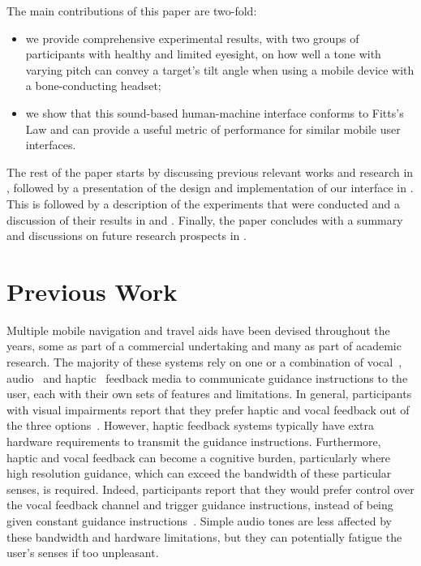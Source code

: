 \documentclass[acmsmall]{acmart}
\begin{document}
The main contributions of this paper are two-fold: 
\begin{itemize}
  \item we provide comprehensive experimental results, with two groups of participants with healthy and limited eyesight, on how well a tone with varying pitch can convey a target's tilt angle when using a mobile device with a bone-conducting headset; 
  \item we show that this sound-based human-machine interface conforms to Fitts's Law and can provide a useful metric of performance for similar mobile user interfaces.
\end{itemize}

The rest of the paper starts by discussing previous relevant works and research in , followed by a presentation of the design and implementation of our interface in .
This is followed by a description of the experiments that were conducted and a discussion of their results in  and .
Finally, the paper concludes with a summary and discussions on future research prospects in .

\section{Previous Work}\label{sec:prev-work}

Multiple mobile navigation and travel aids have been devised throughout the years, some as part of a commercial undertaking and many as part of academic research.
The majority of these systems rely on one or a combination of vocal~\citep{mocanu2016when,chessa2016integrated,kanwal2015navigation}, audio~\citep{schwarze2015intuitive,rodriguez2012obstacle,katz2010navig} and haptic~\citep{rivera-rubio2015assistive,lee2015rgb,xiao2015assistive} feedback media to communicate guidance instructions to the user, each with their own sets of features and limitations.
In general, participants with visual impairments report that they prefer haptic and vocal feedback out of the three options~\citep{arditi2013user}.
However, haptic feedback systems typically have extra hardware requirements to transmit the guidance instructions.
Furthermore, haptic and vocal feedback can become a cognitive burden, particularly where high resolution guidance, which can exceed the bandwidth of these particular senses, is required.
Indeed, participants report that they would prefer control over the vocal feedback channel and trigger guidance instructions, instead of being given constant guidance instructions~\citep{arditi2013user}.
Simple audio tones are less affected by these bandwidth and hardware limitations, but they can potentially fatigue the user's senses if too unpleasant.
\end{document}
